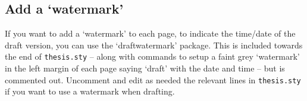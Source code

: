 \subsection{Add a `watermark'}\label{s:watermark}

If you want to add a `watermark' to each page, to indicate the time/date
of the draft version, you can use the `draftwatermark' package. This is
included towards the end of \verb|thesis.sty| -- along with commands to
setup a faint grey `watermark' in the left margin of each page saying
`draft' with the date and time -- but is commented out. Uncomment and
edit as needed the relevant lines in \verb|thesis.sty| if you want to
use a watermark when drafting.

\endinput
